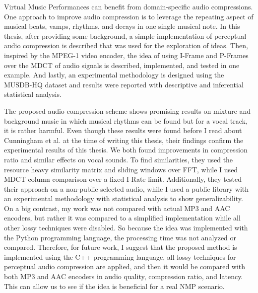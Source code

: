 \label{chapter:concl}

Virtual Music Performances can benefit from domain-specific audio compressions. One approach to improve audio compression is to leverage the repeating aspect of musical beats, vamps, rhythms, and decays in one single musical note. In this thesis, after providing some background, a simple implementation of perceptual audio compression is described that was used for the exploration of ideas. Then, inspired by the MPEG-1 video encoder, the idea of using I-Frame and P-Frames over the MDCT of audio signals is described, implemented, and tested in one example. And lastly, an experimental methodology is designed using the MUSDB-HQ dataset and results were reported with descriptive and inferential statistical analysis.

The proposed audio compression scheme shows promising results on mixture and background music in which musical rhythms can be found but for a vocal track, it is rather harmful. Even though these results were found before I read about Cunningham et al. at the time of writing this thesis, their findings confirm the experimental results of this thesis. We both found improvements in compression ratio and similar effects on vocal sounds. To find similarities, they used the resource heavy similarity matrix and sliding windows over FFT, while I used MDCT column comparison over a fixed I-Rate limit. Additionally, they tested their approach on a non-public selected audio, while I used a public library with an experimental methodology with statistical analysis to show generalizability. On a big contrast, my work was not compared with actual MP3 and AAC encoders, but rather it was compared to a simplified implementation while all other lossy techniques were disabled. So because the idea was implemented with the Python programming language, the processing time was not analyzed or compared. Therefore, for future work, I suggest that the proposed method is implemented using the C++ programming language, all lossy techniques for perceptual audio compression are applied, and then it would be compared with both MP3 and AAC encoders in audio quality, compression ratio, and latency. This can allow us to see if the idea is beneficial for a real NMP scenario.

